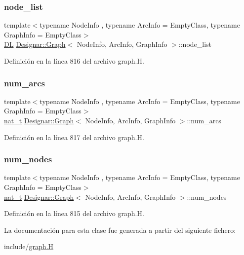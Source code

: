 \subsubsection{\texorpdfstring{node\+\_\+list}{node\_list}}
{\footnotesize\ttfamily template$<$typename Node\+Info , typename Arc\+Info  = Empty\+Class, typename Graph\+Info  = Empty\+Class$>$ \\
\hyperlink{class_designar_1_1_d_l}{DL} \hyperlink{class_designar_1_1_graph}{Designar\+::\+Graph}$<$ Node\+Info, Arc\+Info, Graph\+Info $>$\+::node\+\_\+list\hspace{0.3cm}{\ttfamily [protected]}}



Definición en la línea 816 del archivo graph.\+H.

\mbox{\label{class_designar_1_1_graph_a035a0debf7a7545d0033f37cf941020f}} 
\subsubsection{\texorpdfstring{num\+\_\+arcs}{num\_arcs}}
{\footnotesize\ttfamily template$<$typename Node\+Info , typename Arc\+Info  = Empty\+Class, typename Graph\+Info  = Empty\+Class$>$ \\
\hyperlink{namespace_designar_aa72662848b9f4815e7bf31a7cf3e33d1}{nat\+\_\+t} \hyperlink{class_designar_1_1_graph}{Designar\+::\+Graph}$<$ Node\+Info, Arc\+Info, Graph\+Info $>$\+::num\+\_\+arcs\hspace{0.3cm}{\ttfamily [protected]}}



Definición en la línea 817 del archivo graph.\+H.

\mbox{\label{class_designar_1_1_graph_a1ff2ba87ab27911b1f6d47e622e67542}} 
\subsubsection{\texorpdfstring{num\+\_\+nodes}{num\_nodes}}
{\footnotesize\ttfamily template$<$typename Node\+Info , typename Arc\+Info  = Empty\+Class, typename Graph\+Info  = Empty\+Class$>$ \\
\hyperlink{namespace_designar_aa72662848b9f4815e7bf31a7cf3e33d1}{nat\+\_\+t} \hyperlink{class_designar_1_1_graph}{Designar\+::\+Graph}$<$ Node\+Info, Arc\+Info, Graph\+Info $>$\+::num\+\_\+nodes\hspace{0.3cm}{\ttfamily [protected]}}



Definición en la línea 815 del archivo graph.\+H.



La documentación para esta clase fue generada a partir del siguiente fichero\+:\begin{DoxyCompactItemize}
\item 
include/\hyperlink{graph_8_h}{graph.\+H}\end{DoxyCompactItemize}
